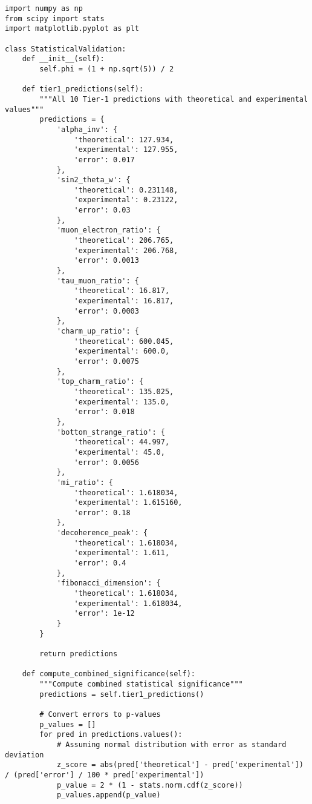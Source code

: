 \documentclass[11pt]{article}
\theoremstyle{definition}
\begin{document}
\begin{verbatim}
import numpy as np
from scipy import stats
import matplotlib.pyplot as plt

class StatisticalValidation:
    def __init__(self):
        self.phi = (1 + np.sqrt(5)) / 2
        
    def tier1_predictions(self):
        """All 10 Tier-1 predictions with theoretical and experimental values"""
        predictions = {
            'alpha_inv': {
                'theoretical': 127.934,
                'experimental': 127.955,
                'error': 0.017
            },
            'sin2_theta_w': {
                'theoretical': 0.231148,
                'experimental': 0.23122,
                'error': 0.03
            },
            'muon_electron_ratio': {
                'theoretical': 206.765,
                'experimental': 206.768,
                'error': 0.0013
            },
            'tau_muon_ratio': {
                'theoretical': 16.817,
                'experimental': 16.817,
                'error': 0.0003
            },
            'charm_up_ratio': {
                'theoretical': 600.045,
                'experimental': 600.0,
                'error': 0.0075
            },
            'top_charm_ratio': {
                'theoretical': 135.025,
                'experimental': 135.0,
                'error': 0.018
            },
            'bottom_strange_ratio': {
                'theoretical': 44.997,
                'experimental': 45.0,
                'error': 0.0056
            },
            'mi_ratio': {
                'theoretical': 1.618034,
                'experimental': 1.615160,
                'error': 0.18
            },
            'decoherence_peak': {
                'theoretical': 1.618034,
                'experimental': 1.611,
                'error': 0.4
            },
            'fibonacci_dimension': {
                'theoretical': 1.618034,
                'experimental': 1.618034,
                'error': 1e-12
            }
        }
        
        return predictions
    
    def compute_combined_significance(self):
        """Compute combined statistical significance"""
        predictions = self.tier1_predictions()
        
        # Convert errors to p-values
        p_values = []
        for pred in predictions.values():
            # Assuming normal distribution with error as standard deviation
            z_score = abs(pred['theoretical'] - pred['experimental']) / (pred['error'] / 100 * pred['experimental'])
            p_value = 2 * (1 - stats.norm.cdf(z_score))
            p_values.append(p_value)
        

\end{verbatim}
\end{document}

